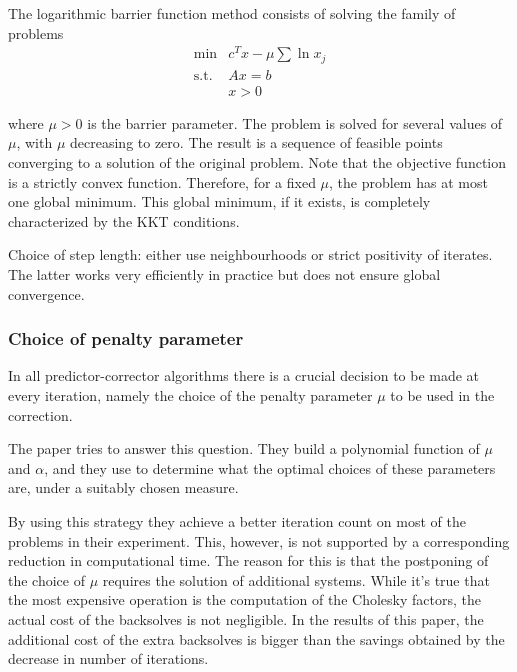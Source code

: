 \hrulefill

The logarithmic barrier function method consists of solving the 
family of problems
\begin{eqnarray*}
   \min & c^Tx - \mu \sum \ln x_j \\
   \mbox{s.t.} & Ax = b \\
               & x>0
\end{eqnarray*}

where $\mu>0$ is the barrier parameter. The problem is solved 
for several values of $\mu$, with $\mu$ decreasing to zero. 
The result is a sequence of feasible points converging to a 
solution of the original problem. Note that the objective 
function is a strictly convex function. Therefore, for a 
fixed $\mu$, the problem has at most one global minimum. 
This global minimum, if it exists, is completely characterized 
by the KKT conditions.

\hrulefill

Choice of step length: either use neighbourhoods or strict 
positivity of iterates. The latter works very efficiently 
in practice but does not ensure global convergence.


%
%
\subsubsection{Choice of penalty parameter}

In all predictor-corrector algorithms there is a crucial decision 
to be made at every iteration, namely the choice of the penalty 
parameter $\mu$ to be used in the correction.

The paper \cite{VillasBoasPerin} tries to answer this question. 
They build a polynomial function of $\mu$ and $\alpha$, and they 
use to determine what the optimal choices of these parameters are, 
under a suitably chosen measure.

By using this strategy they achieve a better iteration count on 
most of the problems in their experiment. This, however, is not 
supported by a corresponding reduction in computational time. 
The reason for this is that the postponing of the choice of $\mu$ 
requires the solution of additional systems. While it's true that 
the most expensive operation is the computation of the Cholesky 
factors, the actual cost of the backsolves is not negligible. 
In the results of this paper, the additional cost of the extra 
backsolves is bigger than the savings obtained by the decrease 
in number of iterations.
